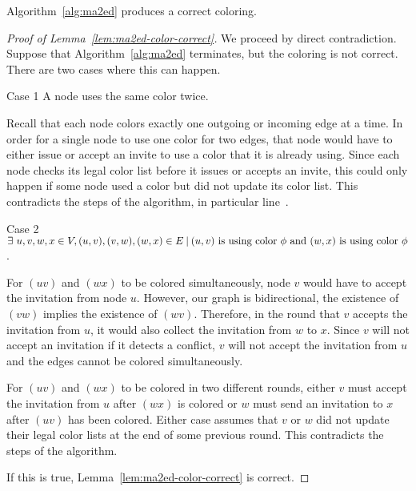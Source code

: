 \begin{lemm}
\label{lem:ma2ed-color-correct}
Algorithm~\ref{alg:ma2ed} produces a correct coloring.
\end{lemm}
\begin{proof}[Proof of Lemma~\ref{lem:ma2ed-color-correct}]
We proceed by direct contradiction. Suppose that Algorithm~\ref{alg:ma2ed} terminates, but the coloring is not correct. There are two cases where this can happen.
\begin{paragraph}{Case 1} A node uses the same color twice.

Recall that each node colors exactly one outgoing or incoming edge at a time. In order for a single node to use one color for two edges, that node would have to either issue or accept an invite to use a color that it is already using. Since each node checks its legal color list before it issues or accepts an invite, this could only happen if some node used a color but did not update its color list. This contradicts the steps of the algorithm, in particular line~.
\end{paragraph}
\begin{paragraph}{Case 2} $\exists\ u,v,w,x \in V, (u,v), (v,w), (w,x) \in E {\: |\:} (u,v) \text{ is using color } \phi \text{ and } (w,x)\text{ is using color } \phi$.

For $(uv)$ and $(wx)$ to be colored simultaneously, node $v$ would have to accept the invitation from node $u$. However, our graph is bidirectional, the existence of $(vw)$ implies the existence of $(wv)$. Therefore, in the round that $v$ accepts the invitation from $u$, it would also collect the invitation from $w$ to $x$. Since $v$ will not accept an invitation if it detects a conflict, $v$ will not accept the invitation from $u$ and the edges cannot be colored simultaneously.

For $(uv)$ and $(wx)$ to be colored in two different rounds, either $v$ must accept the invitation from $u$ after $(wx)$ is colored or $w$ must send an invitation to $x$ after $(uv)$ has been colored. Either case assumes that $v$ or $w$ did not update their legal color lists at the end of some previous round. This contradicts the steps of the algorithm.
\end{paragraph}
If this is true, Lemma~\ref{lem:ma2ed-color-correct} is correct.
\end{proof}

